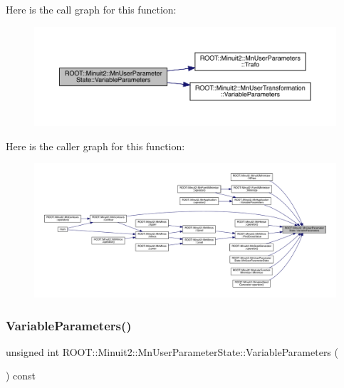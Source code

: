 Here is the call graph for this function\+:
\nopagebreak
\begin{figure}[H]
\begin{center}
\leavevmode
\includegraphics[width=350pt]{d3/de0/classROOT_1_1Minuit2_1_1MnUserParameterState_a8226cef71821d2558f31570f002631a4_cgraph}
\end{center}
\end{figure}
Here is the caller graph for this function\+:
\nopagebreak
\begin{figure}[H]
\begin{center}
\leavevmode
\includegraphics[width=350pt]{d3/de0/classROOT_1_1Minuit2_1_1MnUserParameterState_a8226cef71821d2558f31570f002631a4_icgraph}
\end{center}
\end{figure}
\mbox{\label{classROOT_1_1Minuit2_1_1MnUserParameterState_a8226cef71821d2558f31570f002631a4}} 
\subsubsection{\texorpdfstring{VariableParameters()}{VariableParameters()}\hspace{0.1cm}{\footnotesize\ttfamily [3/3]}}
{\footnotesize\ttfamily unsigned int R\+O\+O\+T\+::\+Minuit2\+::\+Mn\+User\+Parameter\+State\+::\+Variable\+Parameters (\begin{DoxyParamCaption}{ }\end{DoxyParamCaption}) const}




